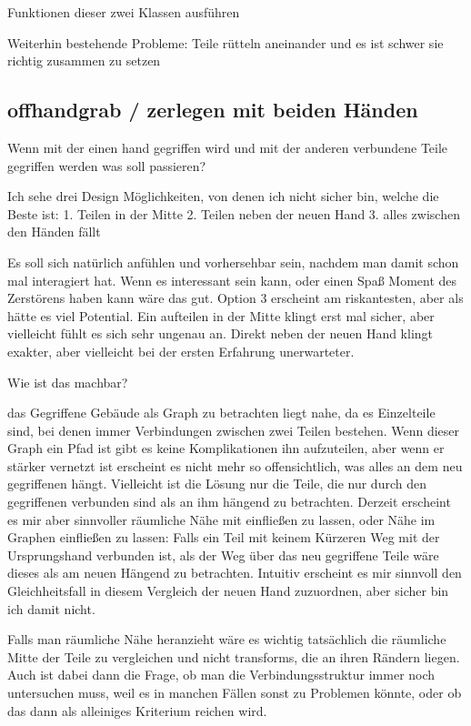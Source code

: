 \documentclass[11pt]{article} %
\begin{document}

Funktionen dieser zwei Klassen ausführen

Weiterhin bestehende Probleme: 
Teile rütteln aneinander und 
es ist schwer sie richtig zusammen zu setzen

\subsection{offhandgrab / zerlegen mit beiden Händen}

Wenn mit der einen hand gegriffen wird und mit der anderen verbundene Teile gegriffen werden was soll passieren?

Ich sehe drei Design Möglichkeiten, von denen ich nicht sicher bin, welche die Beste ist:
1. Teilen in der Mitte
2. Teilen neben der neuen Hand
3. alles zwischen den Händen fällt

Es soll sich natürlich anfühlen und vorhersehbar sein, nachdem man damit schon mal interagiert hat.
Wenn es interessant sein kann, oder einen Spaß Moment des Zerstörens haben kann wäre das gut.
Option 3 erscheint am riskantesten, aber als hätte es viel Potential. 
Ein aufteilen in der Mitte klingt erst mal sicher, aber vielleicht fühlt es sich sehr ungenau an.
Direkt neben der neuen Hand klingt exakter, aber vielleicht bei der ersten Erfahrung unerwarteter.

Wie ist das machbar?

das Gegriffene Gebäude als Graph zu betrachten liegt nahe, da es Einzelteile sind, bei denen immer Verbindungen zwischen zwei Teilen bestehen.
Wenn dieser Graph ein Pfad ist gibt es keine Komplikationen ihn aufzuteilen, aber wenn er stärker vernetzt ist erscheint es nicht mehr so offensichtlich, was alles an dem neu gegriffenen hängt.
Vielleicht ist die Lösung nur die Teile, die nur durch den gegriffenen verbunden sind als an ihm hängend zu betrachten.
Derzeit erscheint es mir aber sinnvoller räumliche Nähe mit einfließen zu lassen, oder Nähe im Graphen einfließen zu lassen: Falls ein Teil mit keinem Kürzeren Weg mit der Ursprungshand verbunden ist, als der Weg über das neu gegriffene Teile wäre dieses als am neuen Hängend zu betrachten.
Intuitiv erscheint es mir sinnvoll den Gleichheitsfall in diesem Vergleich der neuen Hand zuzuordnen, aber sicher bin ich damit nicht.

Falls man räumliche Nähe heranzieht wäre es wichtig tatsächlich die räumliche Mitte der Teile zu vergleichen und nicht transforms, die an ihren Rändern liegen. Auch ist dabei dann die Frage, ob man die Verbindungsstruktur immer noch untersuchen muss, weil es in manchen Fällen sonst zu Problemen könnte, oder ob das dann als alleiniges Kriterium reichen wird.
\end{document}
